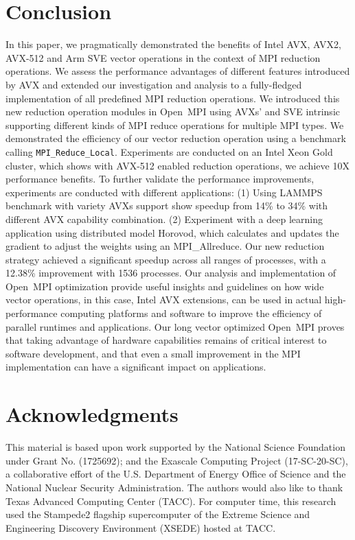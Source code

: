 \documentclass[5p,times,twocolumn]{elsarticle}
\newcommand{\mpifunc}[1]{\lstinline"MPI_#1"\xspace}
\newcommand{\ompi}[0]{Open~MPI\xspace}
\newcommand{\mpi}[0]{\textsc{MPI}\xspace}
\begin{document}
\section{Conclusion}\label{sec:conclusion}
In this paper, we pragmatically demonstrated the benefits of Intel
AVX, AVX2, AVX-512 and Arm SVE vector operations in the context of MPI reduction
operations. We assess the performance advantages of different features
introduced by AVX and extended our investigation and analysis to a
fully-fledged implementation of all predefined MPI reduction
operations.
%
We introduced this new reduction operation modules in \ompi using AVXs'
and SVE intrinsic supporting different kinds of \mpi reduce operations for
multiple \mpi types. We demonstrated the efficiency of our vector
reduction operation using a benchmark calling
\mpifunc{Reduce_Local}. Experiments are conducted on an Intel Xeon
Gold cluster, which shows with AVX-512 enabled reduction operations, we
achieve 10X performance benefits.
%
To further validate the performance improvements, experiments are
conducted with different applications: (1) Using LAMMPS benchmark with variety AVXs
support show speedup from 14\% to 34\% with different AVX capability combination.
(2) Experiment with a deep learning application
using distributed model Horovod, which calculates and updates the
gradient to adjust the weights using an MPI\_Allreduce.  Our new
reduction strategy achieved a significant speedup across all ranges of
processes, with a 12.38\% improvement with 1536 processes.  Our
analysis and implementation of \ompi optimization provide useful
insights and guidelines on how wide vector operations, in this case,
Intel AVX extensions, can be used in actual high-performance computing
platforms and software to improve the efficiency of parallel runtimes
and applications.
%
Our long vector optimized \ompi proves that taking advantage of hardware
capabilities remains of critical interest to software development, and
that even a small improvement in the MPI implementation can have
a significant impact on applications.

\section*{Acknowledgments}
%
This material is based upon work supported by the National Science Foundation under Grant No. (1725692); and the Exascale Computing Project (17-SC-20-SC), a collaborative effort of the
U.S. Department of Energy Office of Science and the National Nuclear Security Administration.
The authors would also like to thank
Texas Advanced Computing Center (TACC). For computer time, this research used
the Stampede2 flagship supercomputer of the Extreme Science and Engineering Discovery Environment (XSEDE) hosted at TACC.

\balance

%
%


\end{document}
